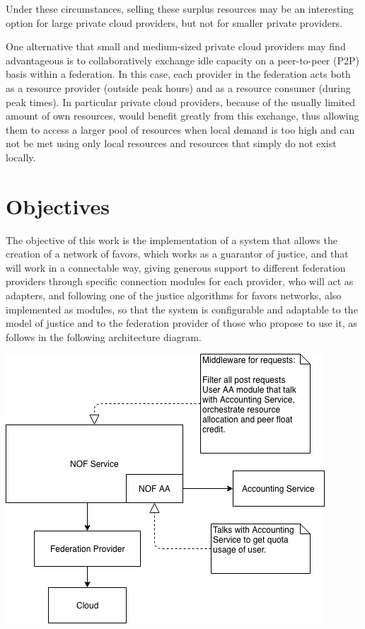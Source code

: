 \documentclass{article}
\begin{document}
Under these circumstances, selling these surplus resources may be an interesting option for large private cloud providers, but not for smaller private providers.

One alternative that small and medium-sized private cloud providers may find advantageous is to collaboratively exchange idle capacity on a peer-to-peer (P2P) basis within a federation. In this case, each provider in the federation acts both as a resource provider (outside peak hours) and as a resource consumer (during peak times). In particular private cloud providers, because of the usually limited amount of own resources, would benefit greatly from this exchange\cite{fairness-benefices}, thus allowing them to access a larger pool of resources when local demand is too high and can not be met using only local resources and resources that simply do not exist locally.

\section{Objectives}
The objective of this work is the implementation of a system that allows the creation of a network of favors, which works as a guarantor of justice, and that will work in a connectable way, giving generous support to different federation providers through specific connection modules for each provider, who will act as adapters, and following one of the justice algorithms for favors networks, also implemented as modules, so that the system is configurable and adaptable to the model of justice and to the federation provider of those who propose to use it, as follows in the following architecture diagram.

\begin{center}
\includegraphics[scale=0.4]{./image/NOF-architecture-generic.png}
\end{center}
\end{document}

